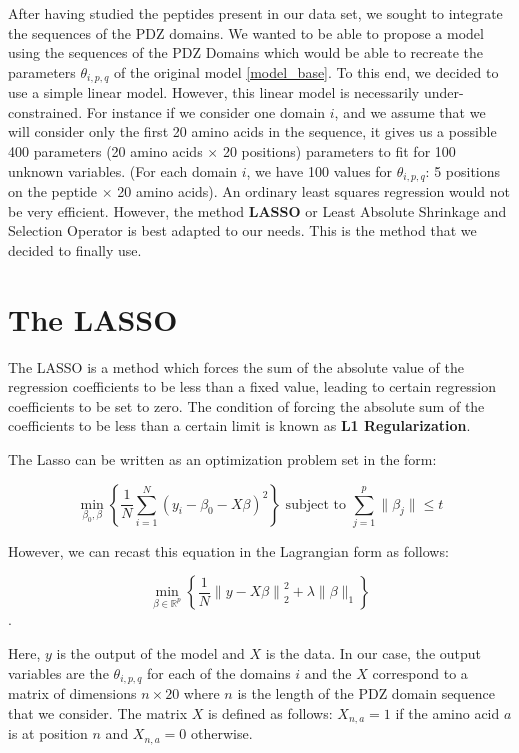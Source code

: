 \documentclass[a4paper, 12pt]{article}
\begin{document}
After having studied the peptides present in our data set, we sought to integrate the sequences of the PDZ domains. We wanted to be able to propose a model using the sequences of the PDZ Domains which would be able to recreate the parameters $\theta_{i,p,q}$ of the original model \eqref{model_base}. To this end, we decided to use a simple linear model. However, this linear model is necessarily under-constrained. For instance if we consider one domain $i$, and we assume that we will consider only the first 20 amino acids in the sequence, it gives us a possible 400 parameters (20 amino acids $\times$ 20 positions) parameters to fit for 100 unknown variables. (For each domain $i$, we have 100 values for $\theta_{i,p,q}$: 5 positions on the peptide $\times$ 20 amino acids). An ordinary least squares regression would not be very efficient. However, the method \textbf{LASSO} or Least Absolute Shrinkage and Selection Operator is best adapted to our needs. This is the method that we decided to finally use. 
\section{The LASSO}

The LASSO is a method which forces the sum of the absolute value of the regression coefficients to be less than a fixed value, leading to certain regression coefficients to be set to zero. The condition of forcing the absolute sum of the coefficients to be less than a certain limit is known as \textbf{L1 Regularization}. 

The Lasso can be written as an optimization problem set in the form: 

\begin{equation} 
\label{lasso_eq_basic_form}
\min_{\beta_0, \beta}\left\{ \frac{1}{N} \sum_{i=1}^N (y_i-\beta_0 - X \beta)^2 \right\}  \text{ subject to } \sum_{j=1}^{p} \|\beta_j\| \leq t
\end{equation}

However, we can recast this equation in the Lagrangian form as follows:

\begin{equation}
\label{lasso_lagrange}
\min_{ \beta \in \mathbb{R}^p } \left\{ \frac{1}{N} \left\| y - X \beta \right\|_2^2 + \lambda \| \beta \|_1 \right\}
\end{equation}. 

Here, $y$ is the output of the model and $X$ is the data. In our case, the output variables are the $\theta_{i,p,q}$ for each of the domains $i$ and the $X$ correspond to a matrix of dimensions $n \times 20$ where $n$ is the length of the PDZ domain sequence that we consider. The matrix $X$ is defined as follows: $X_{n,a} = 1$ if the amino acid $a$ is at position $n$ and $X_{n,a} = 0$ otherwise. 
\end{document}

